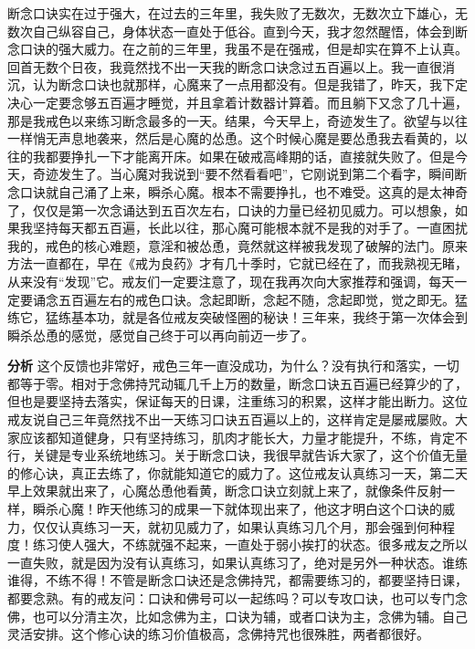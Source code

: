 \begin{case}
    断念口诀实在过于强大，在过去的三年里，我失败了无数次，无数次立下雄心，无数次自己纵容自己，身体状态一直处于低谷。直到今天，我才忽然醒悟，体会到断念口诀的强大威力。在之前的三年里，我虽不是在强戒，但是却实在算不上认真。回首无数个日夜，我竟然找不出一天我的断念口诀念过五百遍以上。我一直很消沉，认为断念口诀也就那样，心魔来了一点用都没有。但是我错了，昨天，我下定决心一定要念够五百遍才睡觉，并且拿着计数器计算着。而且躺下又念了几十遍，那是我戒色以来练习断念最多的一天。结果，今天早上，奇迹发生了。欲望与以往一样悄无声息地袭来，然后是心魔的怂恿。这个时候心魔是要怂恿我去看黄的，以往的我都要挣扎一下才能离开床。如果在破戒高峰期的话，直接就失败了。但是今天，奇迹发生了。当心魔对我说到“要不然看看吧”，它刚说到第二个看字，瞬间断念口诀就自己涌了上来，瞬杀心魔。根本不需要挣扎，也不难受。这真的是太神奇了，仅仅是第一次念诵达到五百次左右，口诀的力量已经初见威力。可以想象，如果我坚持每天都五百遍，长此以往，那心魔可能根本就不是我的对手了。一直困扰我的，戒色的核心难题，意淫和被怂恿，竟然就这样被我发现了破解的法门。原来方法一直都在，早在《戒为良药》才有几十季时，它就已经在了，而我熟视无睹，从来没有“发现”它。戒友们一定要注意了，现在我再次向大家推荐和强调，每天一定要诵念五百遍左右的戒色口诀。念起即断，念起不随，念起即觉，觉之即无。猛练它，猛练基本功，就是各位戒友突破怪圈的秘诀！三年来，我终于第一次体会到瞬杀怂恿的感觉，感觉自己终于可以再向前迈一步了。

    \textbf{分析} 这个反馈也非常好，戒色三年一直没成功，为什么？没有执行和落实，一切都等于零。相对于念佛持咒动辄几千上万的数量，断念口诀五百遍已经算少的了，但也是要坚持去落实，保证每天的日课，注重练习的积累，这样才能出断力。这位戒友说自己三年竟然找不出一天练习口诀五百遍以上的，这样肯定是屡戒屡败。大家应该都知道健身，只有坚持练习，肌肉才能长大，力量才能提升，不练，肯定不行，关键是专业系统地练习。关于断念口诀，我很早就告诉大家了，这个价值无量的修心诀，真正去练了，你就能知道它的威力了。这位戒友认真练习一天，第二天早上效果就出来了，心魔怂恿他看黄，断念口诀立刻就上来了，就像条件反射一样，瞬杀心魔！昨天他练习的成果一下就体现出来了，他这才明白这个口诀的威力，仅仅认真练习一天，就初见威力了，如果认真练习几个月，那会强到何种程度！练习使人强大，不练就强不起来，一直处于弱小挨打的状态。很多戒友之所以一直失败，就是因为没有认真练习，如果认真练习了，绝对是另外一种状态。谁练谁得，不练不得！不管是断念口诀还是念佛持咒，都需要练习的，都要坚持日课，都要念熟。有的戒友问：口诀和佛号可以一起练吗？可以专攻口诀，也可以专门念佛，也可以分清主次，比如念佛为主，口诀为辅，或者口诀为主，念佛为辅。自己灵活安排。这个修心诀的练习价值极高，念佛持咒也很殊胜，两者都很好。
\end{case}

